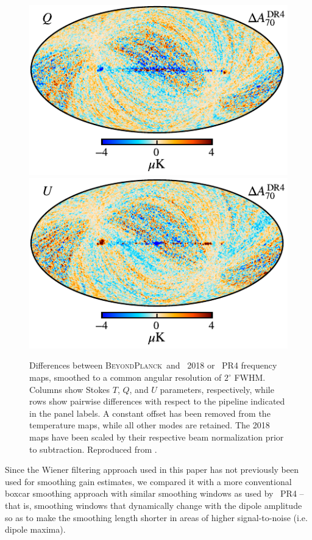 \documentclass[twocolumn]{aa}
\newcommand{\BP}{\textsc{BeyondPlanck}}
\begin{document}
\begin{figure}[p]
  \includegraphics[width=0.27\linewidth]{figs/BP_070_diff_npipe_v2_Q_DIFF_w8_n1024_cb_c-planck.pdf}
  \includegraphics[width=0.27\linewidth]{figs/BP_070_diff_npipe_v2_U_DIFF_w8_n1024_cb_c-planck.pdf}\\
  \caption{Differences between \BP\ and \Planck\ 2018 or \Planck\ PR4 frequency
    maps, smoothed to a common angular resolution of $2^{\circ}$
    FWHM. Columns show Stokes $T$, $Q$, and $U$ parameters,
    respectively, while rows show pairwise differences with respect
    to the pipeline indicated in the panel labels. A constant offset
    has been removed from the temperature maps, while all other modes
    are retained. The 2018 maps have been scaled by their respective
    beam normalization prior to subtraction. Reproduced from \citet{bp10}.
  }\label{fig:freqdiff}

\end{figure}


Since the Wiener filtering approach used in this paper has not previously been used for smoothing gain estimates, we compared it with a more conventional boxcar smoothing approach with similar smoothing windows as used by \Planck\ PR4 -- that is, smoothing windows that dynamically change with the dipole amplitude so as to make the smoothing length shorter in areas of higher signal-to-noise (i.e. dipole maxima).
\end{document}
